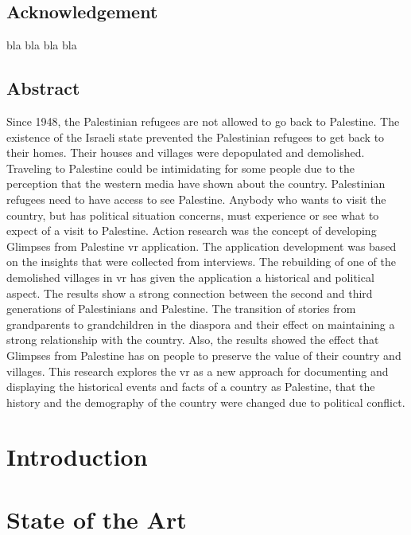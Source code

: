 \documentclass [12pt, oneside] {book}
\begin{document}

\section*{Acknowledgement}
bla bla bla bla
\newpage
\section*{Abstract}
Since 1948, the Palestinian refugees are not allowed to go back to Palestine. The existence of the Israeli state prevented the Palestinian refugees to get back to their homes. Their houses and villages were depopulated and demolished. Traveling to Palestine could be intimidating for some people due to the perception that the western media have shown about the country. Palestinian refugees need to have access to see Palestine. Anybody who wants to visit the country, but has political situation concerns, must experience or see what to expect of a visit to Palestine. Action research was the concept of developing Glimpses from Palestine \acrlong{vr} application. The application development was based on the insights that were collected from interviews. The rebuilding of one of the demolished villages in \acrlong{vr} has given the application a historical and political aspect. The results show a strong connection between the second and third generations of Palestinians and Palestine. The transition of stories from grandparents to grandchildren in the diaspora and their effect on maintaining a strong relationship with the country. Also, the results showed the effect that Glimpses from Palestine has on people to preserve the value of their country and villages. This research explores the \acrlong{vr} as a new approach for documenting and displaying the historical events and facts of a country as Palestine, that the history and the demography of the country were changed due to political conflict. 
\tableofcontents
\listoffigures


\printglossary[type=\acronymtype, title=Abbreviations, nonumberlist]


\chapter{Introduction}

\chapter{State of the Art}

\end{document}

